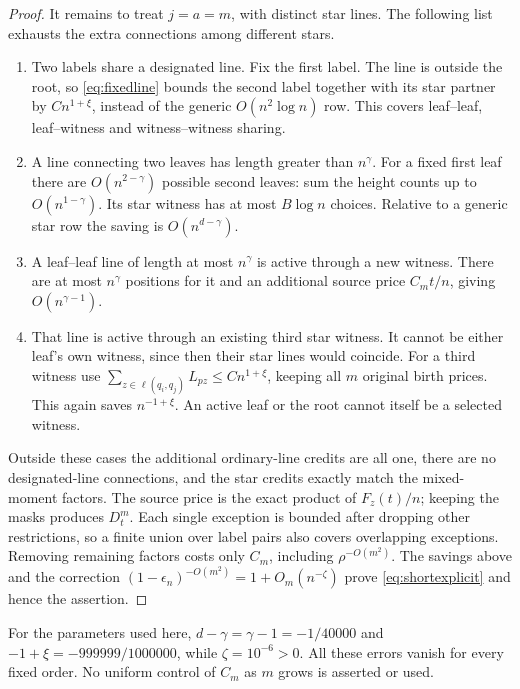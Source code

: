 \begin{proof}
It remains to treat \(j=a=m\), with distinct star lines. The
following list exhausts the extra connections among different stars.
\begin{enumerate}[label=(\roman*)]
\item Two labels share a designated line. Fix the first label.
The line is outside the root, so \eqref{eq:fixedline} bounds the
second label together with its star partner by \(C n^{1+\xi}\),
instead of the generic \(O(n^2\log n)\) row. This covers leaf--leaf,
leaf--witness and witness--witness sharing.
\item A line connecting two leaves has length greater than
\(n^\gamma\). For a fixed first leaf there are
\(O(n^{2-\gamma})\) possible second leaves: sum the height counts
up to \(O(n^{1-\gamma})\). Its star witness has at most
\(B\log n\) choices. Relative to a generic star row the saving
is \(O(n^{d-\gamma})\).
\item A leaf--leaf line of length at most \(n^\gamma\) is active
through a new witness. There are at most \(n^\gamma\) positions
for it and an additional source price \(C_mt/n\), giving
\(O(n^{\gamma-1})\).
\item That line is active through an existing third star witness.
It cannot be either leaf's own witness, since then their star lines
would coincide. For a third witness use
\(\sum_{z\in\ell(q_i,q_j)}L_{pz}\le C n^{1+\xi}\), keeping all
\(m\) original birth prices. This again saves \(n^{-1+\xi}\).
An active leaf or the root cannot itself be a selected witness.
\end{enumerate}
Outside these cases the additional ordinary-line credits are all
one, there are no designated-line connections, and the star credits
exactly match the mixed-moment factors. The source price is the
exact product of \(F_z(t)/n\); keeping the masks produces \(D_t^m\).
Each single exception is bounded after dropping other restrictions,
so a finite union over label pairs also covers overlapping exceptions.
Removing remaining factors costs only \(C_m\), including
\(\rho^{-O(m^2)}\). The savings above and the correction
\((1-\epsilon_n)^{-O(m^2)}=1+O_m(n^{-\zeta})\) prove
\eqref{eq:shortexplicit} and hence the assertion.
\end{proof}

For the parameters used here, \(d-\gamma=\gamma-1=-1/40000\)
and \(-1+\xi=-999999/1000000\), while \(\zeta=10^{-6}>0\).
All these errors vanish for every fixed order. No uniform control
of \(C_m\) as \(m\) grows is asserted or used.

